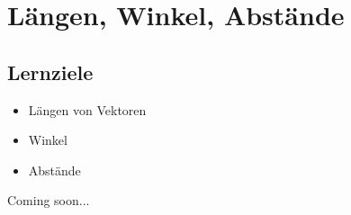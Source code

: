 \section{Längen, Winkel, Abstände}

\subsection*{Lernziele}
\begin{itemize}
\item Längen von Vektoren
\item Winkel 
\item Abstände
\end{itemize}


Coming soon...
